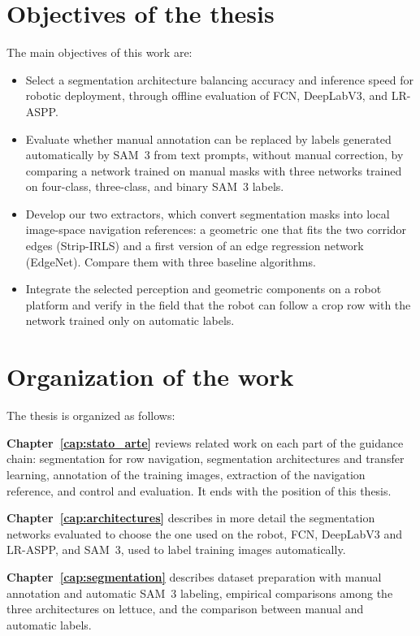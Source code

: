 \clearpage
\section{Objectives of the thesis}
\label{sec:objectives}

The main objectives of this work are:
\begin{itemize}
\item Select a segmentation architecture balancing accuracy and inference speed for robotic deployment, through offline evaluation of FCN, DeepLabV3, and LR-ASPP.
\item Evaluate whether manual annotation can be replaced by labels generated automatically by SAM~3 from text prompts, without manual correction, by comparing a network trained on manual masks with three networks trained on four-class, three-class, and binary SAM~3 labels.
\item Develop our two extractors, which convert segmentation masks into local image-space navigation references: a geometric one that fits the two corridor edges (Strip-IRLS) and a first version of an edge regression network (EdgeNet). Compare them with three baseline algorithms.
\item Integrate the selected perception and geometric components on a robot platform and verify in the field that the robot can follow a crop row with the network trained only on automatic labels.
\end{itemize}

\section{Organization of the work}
\label{sec:organization}

The thesis is organized as follows:

\textbf{Chapter~\ref{cap:stato_arte}} reviews related work on each part of the guidance chain: segmentation for row navigation, segmentation architectures and transfer learning, annotation of the training images, extraction of the navigation reference, and control and evaluation. It ends with the position of this thesis.

\textbf{Chapter~\ref{cap:architectures}} describes in more detail the segmentation networks evaluated to choose the one used on the robot, FCN, DeepLabV3 and LR-ASPP, and SAM~3, used to label training images automatically.

\textbf{Chapter~\ref{cap:segmentation}} describes dataset preparation with manual annotation and automatic SAM~3 labeling, empirical comparisons among the three architectures on lettuce, and the comparison between manual and automatic labels.

